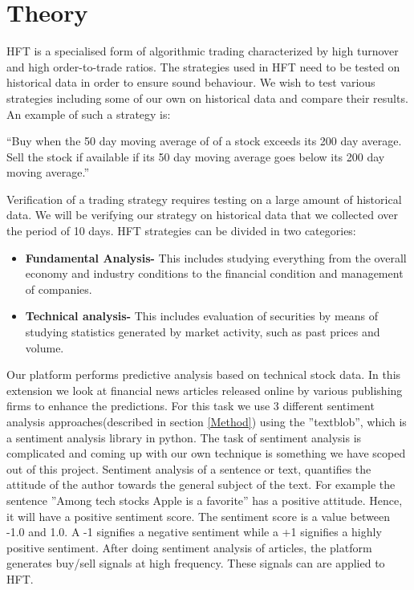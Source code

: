 \documentclass[a4paper,11pt]{article}
\begin{document}
\section{Theory}
HFT is a specialised form of algorithmic trading characterized by high turnover and high order-to-trade ratios. The strategies used in HFT need to be tested on historical data in order to ensure sound behaviour. We wish to test various strategies including some of our own on historical data and compare their results. An example of such a strategy is:
\par“Buy when the 50 day moving average of of a stock exceeds its 200 day average. Sell the stock if available if its 50 day moving average goes below its 200 day moving average.”
\par Verification of a trading strategy requires testing on a large amount of historical data. We will be verifying our strategy on historical data that we collected over the period of 10 days. HFT strategies can be divided in two categories:
\begin{itemize}
\item \textbf{Fundamental Analysis-}  This includes studying everything from the overall economy and industry conditions to the financial condition and management of companies.
\item \textbf{Technical analysis-}  This includes evaluation of securities by means of studying statistics generated by market activity, such as past prices and volume.
\end{itemize}
Our platform performs predictive analysis based on technical stock data. In this extension we look at financial news articles released online by various publishing firms to enhance the predictions. For this task we use 3 different sentiment analysis approaches(described in section \ref{Method}) using the ”textblob”\cite{textblob}, which is a sentiment analysis library in python. The task of sentiment analysis is complicated and coming up with our own technique is something we have scoped out of this project. Sentiment analysis of a sentence or text, quantifies the attitude of the author towards the general subject of the text. For example the sentence ”Among tech stocks Apple is a favorite” has a positive attitude. Hence, it will have a positive sentiment score. The sentiment score is a value between -1.0 and 1.0. A -1 signifies a negative sentiment while a +1 signifies a highly positive sentiment. After doing sentiment analysis of articles, the platform generates buy/sell signals at high frequency. These signals can are applied to HFT.
\end{document}
